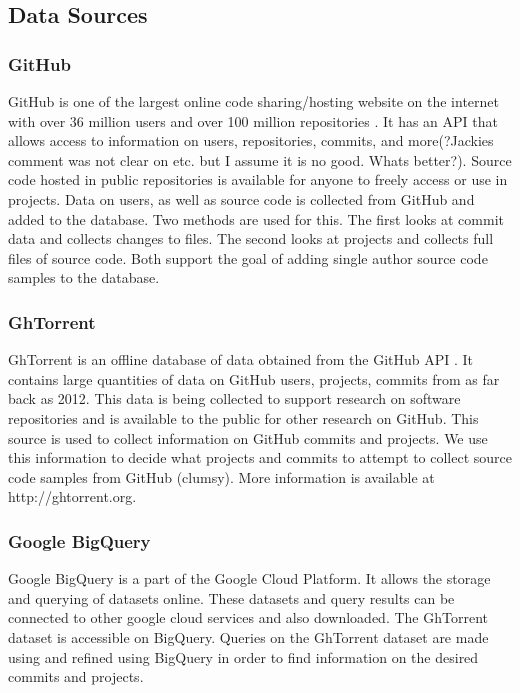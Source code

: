 \documentclass{article}
\begin{document}
\subsection{Data Sources}
\subsubsection*{GitHub}
GitHub is one of the largest online code sharing/hosting website on the internet with over 36 million users and over 100 million repositories \cite{WEBSITE:Git1}. It has an API that allows access to information on users, repositories, commits, and more(?Jackies comment was not clear on etc. but I assume it is no good. Whats better?). Source code hosted in public repositories is available for anyone to freely access or use in projects. Data on users, as well as source code is collected from GitHub and added to the database. Two methods are used for this. The first looks at commit data and collects changes to files. The second looks at projects and collects full files of source code. Both support the goal of adding single author source code samples to the database.

\subsubsection*{GhTorrent}
GhTorrent is an offline database of data obtained from the GitHub API \cite{Gousi13}. It contains large quantities of data on GitHub users, projects, commits from as far back as 2012. This data is being collected to support research on software repositories and is available to the public for other research on GitHub. This source is used to collect information on GitHub commits and projects. We use this information to decide what projects and commits to attempt to collect source code samples from GitHub (clumsy). More information is available at http://ghtorrent.org.

\subsubsection*{Google BigQuery}
Google BigQuery is a part of the Google Cloud Platform. It allows the storage and querying of datasets online. These datasets and query results can be connected to other google cloud services and also downloaded. The GhTorrent dataset is accessible on BigQuery. Queries on the GhTorrent dataset are made  using and refined using BigQuery in order to find information on the desired commits and projects.
\end{document}
